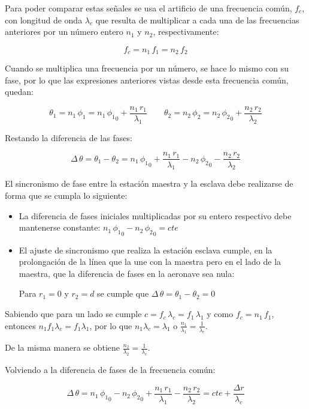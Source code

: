 \begin{description}
Para poder comparar estas se\~nales se usa el artificio de una frecuencia com\'un, $f_c$, con longitud de onda $\lambda_c$ que resulta de multiplicar a cada una de las frecuencias anteriores por un n\'umero entero $n_1$ y $n_2$, respectivamente:

\[
f_c = n_1\,f_1 = n_2\,f_2
\]

Cuando se multiplica una frecuencia por un n\'umero, se hace lo mismo con su fase, por lo que las expresiones anteriores vistas desde esta frecuencia com\'un, quedan:

\[
\theta_1 = n_1\,\phi_1 = n_1\,{\phi_1}_0 + \displaystyle \frac{n_1\,r_1}{\lambda_1} \qquad
\theta_2 = n_2\,\phi_2 = n_2\,{\phi_2}_0 + \displaystyle \frac{n_2\,r_2}{\lambda_2} 
\]

Restando la diferencia de las fases:

\[
\Delta\,\theta = \theta_1-\theta_2 = n_1\,{\phi_1}_0 + \displaystyle \frac{n_1\,r_1}{\lambda_1} -  n_2\,{\phi_2}_0 - \displaystyle \frac{n_2\,r_2}{\lambda_2} 
\]

El sincronismo de fase entre la estaci\'on maestra y la esclava debe realizarse de forma que se cumpla lo siguiente:

\begin{itemize}
\item La diferencia de fases iniciales multiplicadas por su entero respectivo debe mantenerse constante: $n_1\,{\phi_1}_0- n_2\,{\phi_2}_0= cte$

\item El ajuste de sincronismo que realiza la estaci\'on esclava cumple, en la prolongaci\'on de la l\'inea que la une con la maestra pero en el lado de la maestra, que la diferencia de fases en la aeronave sea nula: 

Para $r_1=0$ y $r_2=d$ se cumple que $\Delta\,\theta = \theta_1-\theta_2 =0$

\end{itemize}

Sabiendo que para un lado se cumple $c = f_c\,\lambda_c = f_1\,\lambda_1$ y como $f_c=n_1\,f_1$, entonces $n_1f_1\lambda_c = f_1\lambda_1$, por lo que $n_1\lambda_c=\lambda_1$ o $\displaystyle \frac{n_1}{\lambda_1}=\frac{1}{\lambda_c}$.

De la misma manera se obtiene $\displaystyle \frac{n_2}{\lambda_2}=\frac{1}{\lambda_c}$.

Volviendo a la diferencia de fases de la frecuencia com\'un:

\[
\Delta\,\theta = n_1\,{\phi_1}_0- n_2\,{\phi_2}_0 +  \displaystyle \frac{n_1\,r_1}{\lambda_1}  - \displaystyle \frac{n_2\,r_2}{\lambda_2}= cte + \frac{\Delta r}{\lambda_c}
\]


\end{description}
